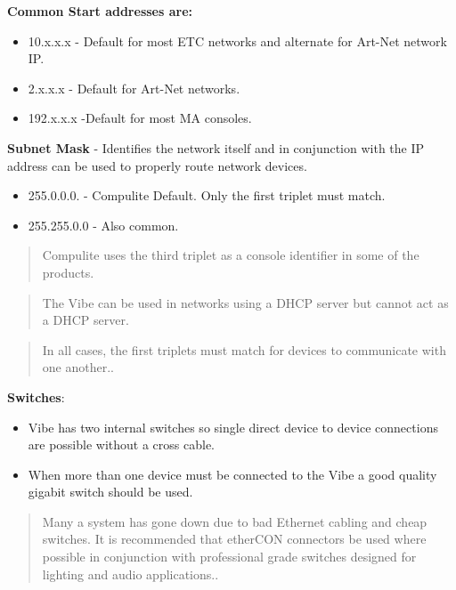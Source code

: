 \documentclass[
]{article}
\begin{document}
\textbf{Common Start addresses are:}

\begin{itemize}
\item
  10.x.x.x - Default for most ETC networks and alternate for Art-Net network IP.
\item
  2.x.x.x - Default for Art-Net networks.
\item
  192.x.x.x -Default for most MA consoles.
\end{itemize}

\textbf{Subnet Mask} - Identifies the network itself and in conjunction with the IP address can be used to properly route network devices.

\begin{itemize}
\item
  255.0.0.0. - Compulite Default. Only the first triplet must match.
\item
  255.255.0.0 - Also common.
\end{itemize}

\begin{quote}
Compulite uses the third triplet as a console identifier in some of the products.
\end{quote}

\begin{quote}
The Vibe can be used in networks using a DHCP server but cannot act as a DHCP server.
\end{quote}

\begin{quote}
{In all cases, the first triplets must match for devices to communicate with one another.}.
\end{quote}

\textbf{Switches}:

\begin{itemize}
\item
  Vibe has two internal switches so single direct device to device connections are possible without a cross cable.
\item
  When more than one device must be connected to the Vibe a good quality gigabit switch should be used.
\end{itemize}

\begin{quote}
{Many a system has gone down due to bad Ethernet cabling and cheap switches. It is recommended that etherCON connectors be used where possible in conjunction with professional grade switches designed for lighting and audio applications.}.
\end{quote}
\end{document}
